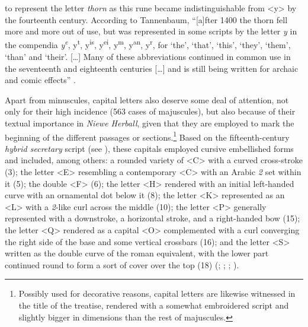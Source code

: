\begin{paper}
{  to represent the letter \emph{thorn} as this rune became
  indistinguishable from \textless y\textgreater{} by the fourteenth
  century. According to Tannenbaum, ``{[}a{]}fter 1400 the thorn fell
  more and more out of use, but was represented in some scripts by the
  letter \emph{y} in the compendia \emph{y\textsuperscript{e}},
  y\textsuperscript{t}, y\textsuperscript{is}, y\textsuperscript{ei},
  y\textsuperscript{m}, y\textsuperscript{an}, y\textsuperscript{r}, for
  `the', `that', `this', `they', `them', `than' and `their'.
  {[}\ldots{]} Many of these abbreviations continued in common use in
  the seventeenth and eighteenth centuries {[}\ldots{]} and is still
  being written for archaic and comic effects'' \citep[88]{tannenbaum_handwriting_1930}.}

Apart from minuscules, capital letters also deserve some deal of
attention, not only for their high incidence (563 cases of majuscules),
but also because of their textual importance in \emph{Niewe Herball},
given that they are employed to mark the beginning of the different
passages or sections.\footnote{Possibly used for decorative reasons,
  capital letters are likewise witnessed in the title of the treatise,
  rendered with a somewhat embroidered script and slightly bigger in
  dimensions than the rest of majuscules.} Based on the
fifteenth-century \emph{hybrid secretary} script (see \cite[17--18]{petti_english_1977}), these capitals employed cursive embellished forms and included,
among others: a rounded variety of
\textless C\textgreater{} with a curved cross-stroke (3); the letter
\textless E\textgreater{} resembling a contemporary
\textless C\textgreater{} with an Arabic \emph{2} set within it (5); the
double \textless F\textgreater{} (6); the letter
\textless H\textgreater{} rendered with an initial left-handed curve
with an ornamental dot below it (8); the letter
\textless K\textgreater{} represented as an \textless L\textgreater{}
with a \emph{2}-like curl across the middle (10); the letter
\textless P\textgreater{} generally represented with a downstroke, a
horizontal stroke, and a right-handed bow (15); the letter
\textless Q\textgreater{} rendered as a capital
\textless O\textgreater{} complemented with a curl converging the right
side of the base and some vertical crossbars (16); and the letter
\textless S\textgreater{} written as the double curve of the roman
equivalent, with the lower part continued round to form a sort of cover
over the top (18) (\cite[31--36]{mckerrow_capital_1927}; \cite[95--118]{tannenbaum_handwriting_1930};
\cite[13--16]{dawson_elizabethan_1966}; \cite[17--18]{petti_english_1977}).





\end{paper}
